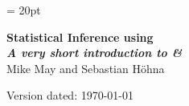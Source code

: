 \documentclass[11pt]{article}
\begin{document}
\renewcommand{\headrulewidth}{0.5pt}
\headsep = 20pt
\lhead{ }

\thispagestyle{plain}
\begin{center}

\textbf{\LARGE Statistical Inference using \RevBayes}\\\vspace{2mm}
\textbf{\it{\Large A very short introduction to \RevBayes \& \Rev}}\\\vspace{2mm}
\vspace{1cm}
{\Large Mike May and Sebastian H{\"o}hna}
\vspace{1cm}
\end{center}

\def \ResourcePath {./}
\def \GlobalResourcePath {../}


Version dated: \today
\end{document}
